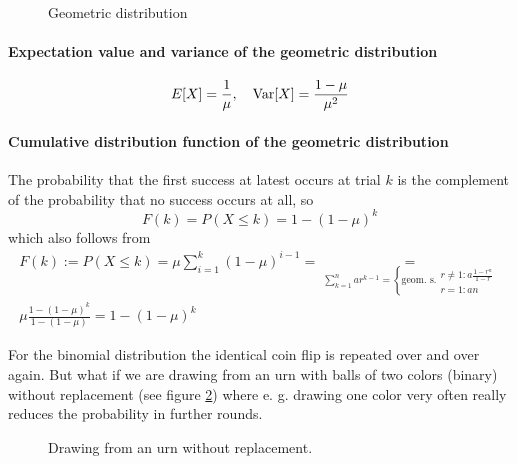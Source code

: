 \begin{figure}[!htb]
    \centering
    
    \caption{Geometric distribution}
    \label{fig:geometric}
\end{figure}

\paragraph*{Expectation value and variance of the geometric distribution}
\begin{equation}
    E[X] = \frac{1}{\mu}, \quad \operatorname{Var}[X] = \frac{1-\mu}{\mu^2}
\end{equation}

\paragraph*{Cumulative distribution function of the geometric distribution}
The probability that the first success at latest occurs
at trial $k$ is the complement of the probability
that no success occurs at all, so
\begin{equation}
    F(k) = P(X \leq k) = 1 - (1-\mu)^k
\end{equation}
which also follows from
\begin{equation}
    \begin{gathered}
        F(k):=P(X \leq k)=\mu \sum_{i=1}^k(1-\mu)^{i-1} = \underset{\sum_{k=1}^n a r^{k-1}=\left\{\text{geom. s.}\begin{array}{c}
            r \neq 1: a \frac{1-r^n}{1-r} \\
            r=1: a n
            \end{array}\right.}{=} \\ \mu \frac{1-(1-\mu)^k}{1-(1-\mu)} = 1- (1-\mu)^k
    \end{gathered}
\end{equation}

For the binomial distribution the identical coin flip is repeated over and over again. But what if we are drawing 
from an urn with balls of two colors (binary) without replacement (see figure \ref{fig:urn_without_rep}) where e. g. 
drawing one color very often really reduces the probability in further rounds.

\begin{figure}[!htb]
    \centering
    
    \caption{Drawing from an urn without replacement.}
    \label{fig:urn_without_rep}
\end{figure}


